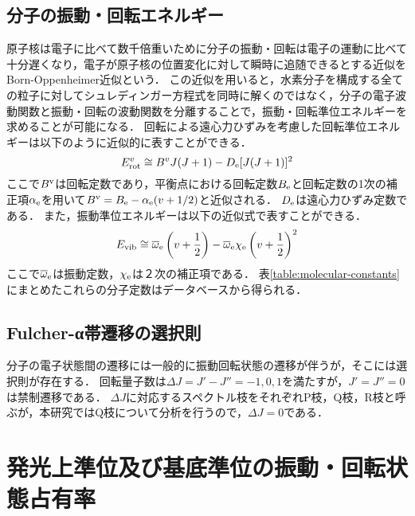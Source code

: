 \subsection{分子の振動・回転エネルギー}
原子核は電子に比べて数千倍重いために分子の振動・回転は電子の運動に比べて十分遅くなり，電子が原子核の位置変化に対して瞬時に追随できるとする近似をBorn-Oppenheimer近似という．
この近似を用いると，水素分子を構成する全ての粒子に対してシュレディンガー方程式を同時に解くのではなく，分子の電子波動関数と振動・回転の波動関数を分離することで，振動・回転準位エネルギーを求めることが可能になる．
回転による遠心力ひずみを考慮した回転準位エネルギーは以下のように近似的に表すことができる\cite{bunsibunko-no-kiso}．
\begin{equation}
    E^v_{\rm rot} \cong B^v J (J+1) - D_{\rm e} [J(J+1)]^2
\end{equation}
ここで$B^{\rm v}$は回転定数であり，平衡点における回転定数$B_{\rm e}$と回転定数の1次の補正項$\alpha_{\rm e}$を用いて$B^{\rm v}=B_{\rm e} - \alpha_{\rm e} (v + 1/2)$と近似される．
$D_{\rm e}$は遠心力ひずみ定数である．
また，振動準位エネルギーは以下の近似式で表すことができる．
\begin{equation}
    E_{\rm vib} \cong \overline{\omega}_{\rm e} \left(v + \frac{1}{2} \right) - \overline{\omega}_{\rm e} \chi_{\rm e} \left(v + \frac{1}{2} \right)^2
\end{equation}
ここで$\overline{\omega}_{\rm e}$は振動定数，$\chi_{\rm e}$は２次の補正項である．
表\ref{table:molecular-constants}にまとめたこれらの分子定数はデータベース\cite{nist}から得られる．

\subsection{Fulcher-α帯遷移の選択則}
分子の電子状態間の遷移には一般的に振動回転状態の遷移が伴うが，そこには選択則が存在する\cite{bunsibunko-no-kiso}．
回転量子数は$\Delta J = J' - J'' = -1,0,1$を満たすが，$J'=J''=0$は禁制遷移である．
$\Delta J$に対応するスペクトル枝をそれぞれP枝，Q枝，R枝と呼ぶが，本研究ではQ枝について分析を行うので，$\Delta J = 0$である．

\section{発光上準位及び基底準位の振動・回転状態占有率}

